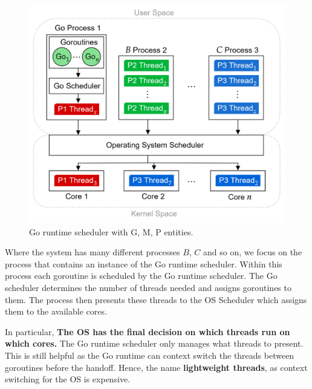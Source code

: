 \begin{figure}[h]
    
    \includegraphics[width=1\textwidth]{Sections/rpc/high_sched.png}
    \caption{Go runtime scheduler with G, M, P entities.}
    \label{fig:go_scheduler}
\end{figure}
\noindent
Where the system has many different processes $B$, $C$ and so on, we focus on the process that contains an instance of the Go runtime scheduler.
Within this process each goroutine is scheduled by the Go runtime scheduler. The Go scheduler determines the number of threads needed
and assigns goroutines to them. The process then presents these threads to the OS Scheduler which assigns them to the available cores.

In particular, \textbf{The OS has the final decision on which threads run on which cores.} The Go runtime scheduler only manages what threads to present.
This is still helpful as the Go runtime can context switch the threads between goroutines before the handoff. Hence, the name \textbf{lightweight threads}, as 
context switching for the OS is expensive.

